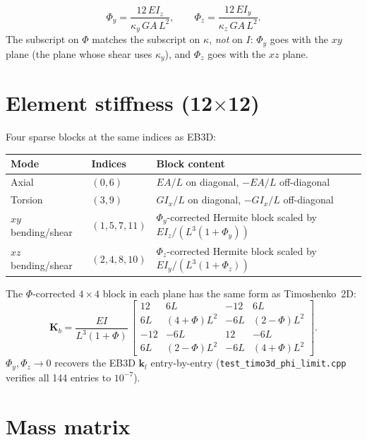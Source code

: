 \documentclass[11pt,a4paper]{book}
\newcommand{\bmath}[1]{\boldsymbol{#1}}
\begin{document}
\[
\boxed{\;\Phi_y = \dfrac{12\,E I_z}{\kappa_y\,GA\,L^2}, \qquad
        \Phi_z = \dfrac{12\,E I_y}{\kappa_z\,GA\,L^2}.\;}
\]
The subscript on $\Phi$ matches the subscript on $\kappa$, \emph{not} on $I$: $\Phi_y$ goes with the $xy$ plane (the plane whose shear uses $\kappa_y$), and $\Phi_z$ goes with the $xz$ plane.

\section{Element stiffness (12$\times$12)}

Four sparse blocks at the same indices as EB3D:

\begin{center}
\begin{tabular}{l l l}
\toprule
Mode & Indices & Block content \\
\midrule
Axial    & $(0, 6)$           & $EA/L$ on diagonal, $-EA/L$ off-diagonal \\
Torsion  & $(3, 9)$           & $G I_x / L$ on diagonal, $-G I_x / L$ off-diagonal \\
$xy$ bending/shear & $(1, 5, 7, 11)$ & $\Phi_y$-corrected Hermite block scaled by $EI_z/(L^3(1+\Phi_y))$ \\
$xz$ bending/shear & $(2, 4, 8, 10)$ & $\Phi_z$-corrected Hermite block scaled by $EI_y/(L^3(1+\Phi_z))$ \\
\bottomrule
\end{tabular}
\end{center}

The $\Phi$-corrected $4\times 4$ block in each plane has the same form as Timoshenko~2D:
\[
\bmath{K}_b = \dfrac{EI}{L^3(1+\Phi)}\,
\begin{bmatrix}
12 & 6L & -12 & 6L \\
6L & (4+\Phi)L^2 & -6L & (2-\Phi)L^2 \\
-12 & -6L & 12 & -6L \\
6L & (2-\Phi)L^2 & -6L & (4+\Phi)L^2
\end{bmatrix}.
\]
$\Phi_y, \Phi_z \to 0$ recovers the EB3D $\bmath{k}_l$ entry-by-entry (\texttt{test\_timo3d\_phi\_limit.cpp} verifies all 144 entries to $10^{-7}$).

\section{Mass matrix}
\end{document}
